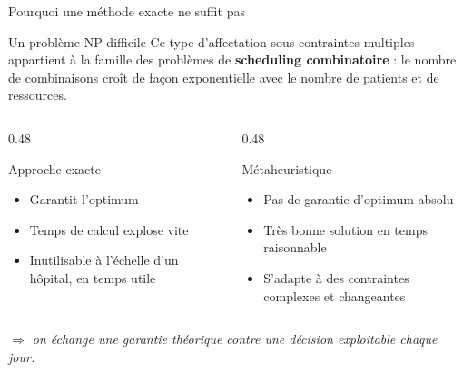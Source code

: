 \documentclass[aspectratio=169,11pt]{beamer}
\begin{document}
\begin{frame}{Pourquoi une méthode exacte ne suffit pas}
  \begin{block}{Un problème NP-difficile}
    Ce type d'affectation sous contraintes multiples appartient à la famille
    des problèmes de \textbf{scheduling combinatoire} : le nombre de
    combinaisons croît de façon exponentielle avec le nombre de patients et de
    ressources.
  \end{block}
  \begin{columns}[T]
    \begin{column}{0.48\textwidth}
      \begin{block}{Approche exacte}
        \begin{itemize}
          \item Garantit l'optimum
          \item Temps de calcul explose vite
          \item Inutilisable à l'échelle d'un hôpital, en temps utile
        \end{itemize}
      \end{block}
    \end{column}
    \begin{column}{0.48\textwidth}
      \begin{block}{Métaheuristique}
        \begin{itemize}
          \item Pas de garantie d'optimum absolu
          \item Très bonne solution en temps raisonnable
          \item S'adapte à des contraintes complexes et changeantes
        \end{itemize}
      \end{block}
    \end{column}
  \end{columns}
  \centering
  \textit{$\Rightarrow$ on échange une garantie théorique contre une décision
  exploitable chaque jour.}
\end{frame}
\end{document}

